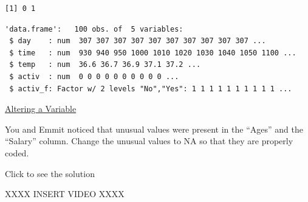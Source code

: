\documentclass[
  letterpaper,
  DIV=11,
  numbers=noendperiod]{scrreprt}
\newenvironment{Shaded}{\begin{snugshade}}{\end{snugshade}}
\newcommand{\FunctionTok}[1]{\textcolor[rgb]{0.28,0.35,0.67}{#1}}
\newcommand{\NormalTok}[1]{\textcolor[rgb]{0.00,0.23,0.31}{#1}}
\newcommand{\OtherTok}[1]{\textcolor[rgb]{0.00,0.23,0.31}{#1}}
\newcommand{\SpecialCharTok}[1]{\textcolor[rgb]{0.37,0.37,0.37}{#1}}
\newcommand{\StringTok}[1]{\textcolor[rgb]{0.13,0.47,0.30}{#1}}
\begin{document}
\begin{Shaded}
\end{Shaded}

\begin{verbatim}
[1] 0 1
\end{verbatim}

\begin{Shaded}
\end{Shaded}

\begin{verbatim}
'data.frame':   100 obs. of  5 variables:
 $ day    : num  307 307 307 307 307 307 307 307 307 307 ...
 $ time   : num  930 940 950 1000 1010 1020 1030 1040 1050 1100 ...
 $ temp   : num  36.6 36.7 36.9 37.1 37.2 ...
 $ activ  : num  0 0 0 0 0 0 0 0 0 0 ...
 $ activ_f: Factor w/ 2 levels "No","Yes": 1 1 1 1 1 1 1 1 1 1 ...
\end{verbatim}

\begin{watch}{}{}
    \href{https://youtu.be/fAcw4RpMgzU}{Altering a Variable}
\end{watch}

\begin{tcolorbox}[enhanced jigsaw, colbacktitle=quarto-callout-tip-color!10!white, breakable, bottomrule=.15mm, colframe=quarto-callout-tip-color-frame, left=2mm, opacitybacktitle=0.6, title=\textcolor{quarto-callout-tip-color}{\faLightbulb}\hspace{0.5em}{Try it Out}, leftrule=.75mm, opacityback=0, rightrule=.15mm, titlerule=0mm, bottomtitle=1mm, colback=white, toprule=.15mm, arc=.35mm, toptitle=1mm, coltitle=black]

You and Emmit noticed that unusual values were present in the ``Ages''
and the ``Salary'' column. Change the unusual values to NA so that they
are properly coded.

Click to see the solution

XXXX INSERT VIDEO XXXX

\end{tcolorbox}
\end{document}
